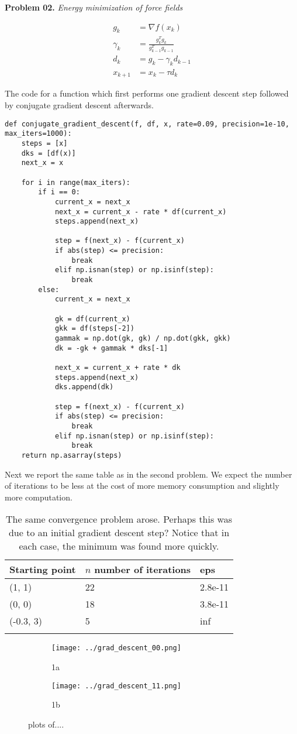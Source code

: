 \documentclass{article}
\newcommand{\exnum}{02} %
\newcounter{problem}[section]
\newenvironment{prob}[1]
{
    \refstepcounter{problem}
    \Large{\textbf{Problem \exnum.\theproblem}  \qquad \textit{#1}}
    \begin{enumerate}[label=\alph*]
    \normalsize
}{
    \end{enumerate}
}
\begin{document}
\begin{prob}{Energy minimization of force fields}
\begin{align}
	g_{k} &= \nabla f(x_{k}) \\
	\gamma_{k} &= \frac{g_{k}^{T} g_{k}}{g_{k-1}^{T} g_{k-1}} \\
	d_{k} &= g_{k} - \gamma_{k} d_{k-1} \\
	x_{k+1} &= x_{k} - \tau d_{k}
\end{align}

The code for a function which first performs one gradient descent step followed by conjugate gradient descent afterwards.

\begin{lstlisting}[frame=single]  % Start your code-block
def conjugate_gradient_descent(f, df, x, rate=0.09, precision=1e-10, max_iters=1000):
	steps = [x]
	dks = [df(x)]
	next_x = x
	
	for i in range(max_iters):
		if i == 0:
			current_x = next_x
			next_x = current_x - rate * df(current_x)
			steps.append(next_x)
			
			step = f(next_x) - f(current_x)
			if abs(step) <= precision:
				break
			elif np.isnan(step) or np.isinf(step):
				break
		else:
			current_x = next_x
			
			gk = df(current_x)
			gkk = df(steps[-2])
			gammak = np.dot(gk, gk) / np.dot(gkk, gkk)
			dk = -gk + gammak * dks[-1]
			
			next_x = current_x + rate * dk
			steps.append(next_x)
			dks.append(dk)
			
			step = f(next_x) - f(current_x)
			if abs(step) <= precision:
				break
			elif np.isnan(step) or np.isinf(step):
				break
	return np.asarray(steps)
\end{lstlisting}

Next we report the same table as in the second problem. We expect the number of iterations to be less at the cost of more memory consumption and slightly more computation.

\begin{longtable}[]{@{}lll@{}}
	\toprule
	Starting point & $n$ number of iterations & eps \tabularnewline
	\midrule
	\endhead
	(1, 1) & 22 & 2.8e-11 \tabularnewline
	(0, 0) & 18 & 3.8e-11 \tabularnewline
	(-0.3, 3) & 5 & inf \tabularnewline
	\bottomrule
	\caption{The same convergence problem arose. Perhaps this was due to an initial gradient descent step? Notice that in each case, the minimum was found more quickly.}
	\label{table:prob02}
\end{longtable}

\begin{figure}
	\begin{subfigure}{.5\textwidth}
		\centering
		\texttt{[image: ../grad\_descent\_00.png]}
		\caption{1a}
		\label{fig:sfig1}
	\end{subfigure}%
	\begin{subfigure}{.5\textwidth}
		\centering
		\texttt{[image: ../grad\_descent\_11.png]}
		\caption{1b}
		\label{fig:sfig2}
	\end{subfigure}
	\caption{plots of....}
	\label{fig:fig}
\end{figure}






\end{prob}
\end{document}
